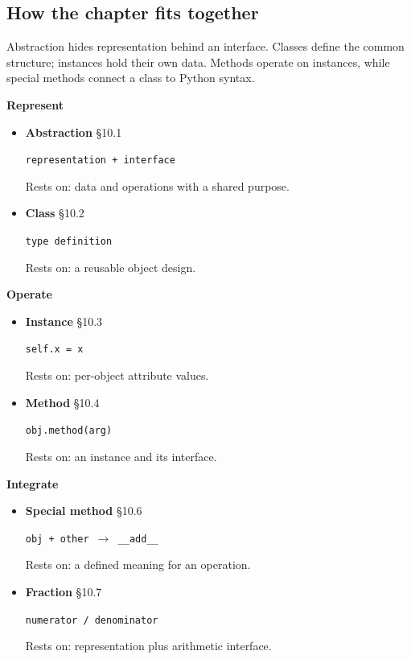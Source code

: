 \documentclass[11pt]{article}
\begin{document}
\begin{keepsection}
\section{How the chapter fits together}

Abstraction hides representation behind an interface. Classes define the common structure; instances hold their own data. Methods operate on instances, while special methods connect a class to Python syntax.

\textbf{Represent}

\begin{itemize}
\item {}
\textbf{Abstraction} \hfill{\small\color{FAUblue}§10.1}

\texttt{representation + interface}

Rests on: data and operations with a shared purpose.
\item {}
\textbf{Class} \hfill{\small\color{FAUblue}§10.2}

\texttt{type definition}

Rests on: a reusable object design.
\end{itemize}

\textbf{Operate}

\begin{itemize}
\item {}
\textbf{Instance} \hfill{\small\color{FAUblue}§10.3}

\texttt{self.x = x}

Rests on: per-object attribute values.
\item {}
\textbf{Method} \hfill{\small\color{FAUblue}§10.4}

\texttt{obj.method(arg)}

Rests on: an instance and its interface.
\end{itemize}

\textbf{Integrate}

\begin{itemize}
\item {}
\textbf{Special method} \hfill{\small\color{FAUblue}§10.6}

\texttt{obj + other \ensuremath{\to} \_\_add\_\_}

Rests on: a defined meaning for an operation.
\item {}
\textbf{Fraction} \hfill{\small\color{FAUblue}§10.7}

\texttt{numerator / denominator}

Rests on: representation plus arithmetic interface.
\end{itemize}
\end{keepsection}
\end{document}
